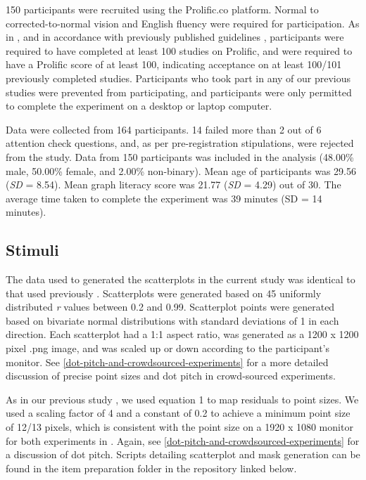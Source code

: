 \documentclass{vgtc}                          %
\begin{document}
150 participants were recruited using the Prolific.co platform. Normal to
corrected-to-normal vision and English fluency were required for participation. As in
\cite{strain_2023}, and in accordance with previously published guidelines \cite{peer_2021},
participants were required to have completed at least 100 studies on Prolific, and were
required to have a Prolific score of at least 100, indicating acceptance on at least
100/101 previously completed studies. Participants who took part in any of our
previous studies were prevented from participating, and participants were only
permitted to complete the experiment on a desktop or laptop computer.

Data were collected from 164 participants. 14 failed more than 2 out of 6 attention
check questions, and, as per pre-registration stipulations, were rejected from the study. Data
from 150 participants was included in the analysis (48.00\% male, 50.00\% female, and 2.00\% non-binary). Mean age of participants was 29.56
(\emph{SD} = 8.54). Mean graph literacy score was 21.77
(\emph{SD} = 4.29) out of 30. The average time taken to complete
the experiment was 39 minutes (SD = 14 minutes).

\hypertarget{stimuli}{%
\subsection{Stimuli}\label{stimuli}}

The data used to generated the scatterplots in the current study was identical to that
used previously \cite{strain_2023}. Scatterplots were generated based on 45 uniformly distributed \emph{r} values
between 0.2 and 0.99. Scatterplot points were generated based on bivariate normal
distributions with standard deviations of 1 in each direction. Each scatterplot
had a 1:1 aspect ratio, was generated as a 1200 x 1200 pixel .png image, and was
scaled up or down according to the participant's monitor. See \autoref{dot-pitch-and-crowdsourced-experiments}
for a more detailed discussion of precise point sizes and dot pitch in crowd-sourced
experiments.

As in our previous study \cite{strain_2023}, we used equation 1 to map residuals
to point sizes. We used a scaling factor of 4 and a constant of 0.2 to achieve a
minimum point size of 12/13 pixels, which is consistent with the point size on
a 1920 x 1080 monitor for both experiments in \cite{strain_2023}. Again, see \autoref{dot-pitch-and-crowdsourced-experiments}
for a discussion of dot pitch. Scripts detailing scatterplot and mask generation
can be found in the item preparation folder in the repository linked below.
\end{document}
